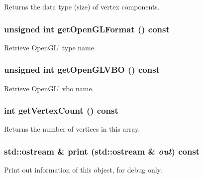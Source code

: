 Returns the data type (size) of vertex components. \hypertarget{classm3g_1_1VertexArray_3e28ae5596cde78a980de02005a136f2}{
\subsubsection[{getOpenGLFormat}]{\setlength{\rightskip}{0pt plus 5cm}unsigned int getOpenGLFormat () const}}
\label{classm3g_1_1VertexArray_3e28ae5596cde78a980de02005a136f2}


Retrieve OpenGL' type name. \hypertarget{classm3g_1_1VertexArray_720ecee697dbf11d5f90dc998817b39d}{
\subsubsection[{getOpenGLVBO}]{\setlength{\rightskip}{0pt plus 5cm}unsigned int getOpenGLVBO () const}}
\label{classm3g_1_1VertexArray_720ecee697dbf11d5f90dc998817b39d}


Retrieve OpenGL' vbo name. \hypertarget{classm3g_1_1VertexArray_c1c9b7f5b0dcd9c0310d7e77e10081ba}{
\subsubsection[{getVertexCount}]{\setlength{\rightskip}{0pt plus 5cm}int getVertexCount () const}}
\label{classm3g_1_1VertexArray_c1c9b7f5b0dcd9c0310d7e77e10081ba}


Returns the number of vertices in this array. \hypertarget{classm3g_1_1VertexArray_6fea17fa1532df3794f8cb39cb4f911f}{
\subsubsection[{print}]{\setlength{\rightskip}{0pt plus 5cm}std::ostream \& print (std::ostream \& {\em out}) const}}
\label{classm3g_1_1VertexArray_6fea17fa1532df3794f8cb39cb4f911f}


Print out information of this object, for debug only. 

